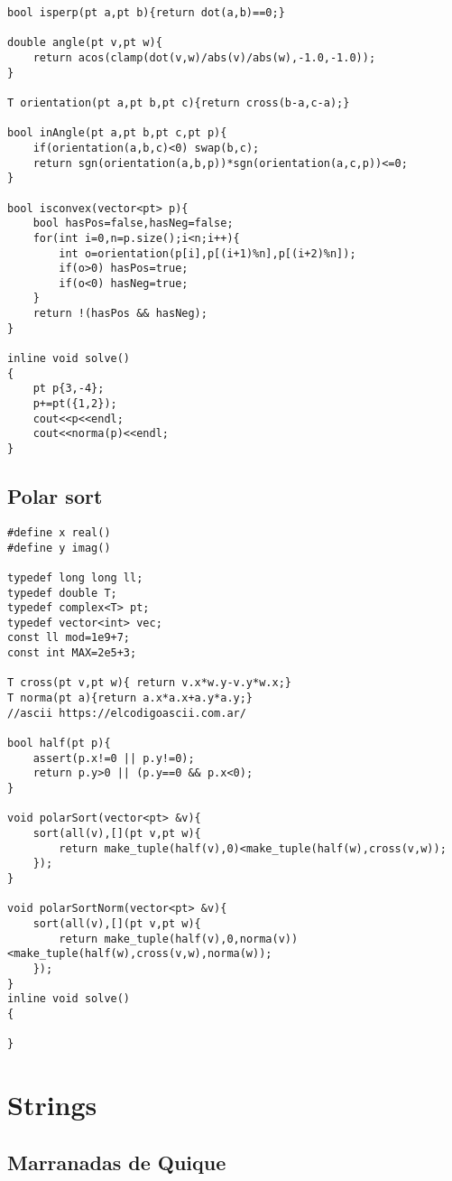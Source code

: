 \documentclass[10pt]{article}
\begin{document}
\begin{multicols*}{2}
\begin{lstlisting}[style=compactcpp]
bool isperp(pt a,pt b){return dot(a,b)==0;}

double angle(pt v,pt w){
    return acos(clamp(dot(v,w)/abs(v)/abs(w),-1.0,-1.0));
}

T orientation(pt a,pt b,pt c){return cross(b-a,c-a);}

bool inAngle(pt a,pt b,pt c,pt p){
    if(orientation(a,b,c)<0) swap(b,c);
    return sgn(orientation(a,b,p))*sgn(orientation(a,c,p))<=0;
}

bool isconvex(vector<pt> p){
    bool hasPos=false,hasNeg=false;
    for(int i=0,n=p.size();i<n;i++){
        int o=orientation(p[i],p[(i+1)%n],p[(i+2)%n]);
        if(o>0) hasPos=true;
        if(o<0) hasNeg=true;
    }
    return !(hasPos && hasNeg);
}

inline void solve()
{
    pt p{3,-4};
    p+=pt({1,2});
    cout<<p<<endl;
    cout<<norma(p)<<endl;
}
\end{lstlisting}

\subsection{Polar sort}

\begin{lstlisting}[style=compactcpp]
#define x real() 
#define y imag()
 
typedef long long ll;
typedef double T;
typedef complex<T> pt;
typedef vector<int> vec;
const ll mod=1e9+7;
const int MAX=2e5+3;

T cross(pt v,pt w){ return v.x*w.y-v.y*w.x;}
T norma(pt a){return a.x*a.x+a.y*a.y;}
//ascii https://elcodigoascii.com.ar/

bool half(pt p){
    assert(p.x!=0 || p.y!=0);
    return p.y>0 || (p.y==0 && p.x<0);
}

void polarSort(vector<pt> &v){
    sort(all(v),[](pt v,pt w){
        return make_tuple(half(v),0)<make_tuple(half(w),cross(v,w));
    });
}

void polarSortNorm(vector<pt> &v){
    sort(all(v),[](pt v,pt w){
        return make_tuple(half(v),0,norma(v))<make_tuple(half(w),cross(v,w),norma(w));
    });
}
inline void solve()
{

}
\end{lstlisting}

\section{Strings}

\subsection{Marranadas de Quique}
\begin{lstlisting}[style=compactcpp]


\end{lstlisting}
\end{multicols*}
\end{document}
